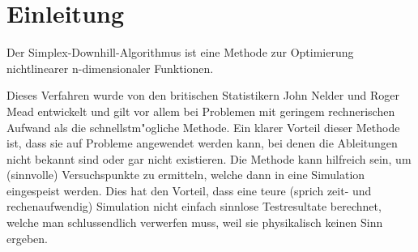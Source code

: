 \section{Einleitung}
Der Simplex-Downhill-Algorithmus ist eine Methode zur Optimierung nichtlinearer n-dimensionaler Funktionen.

Dieses Verfahren wurde von den britischen Statistikern John Nelder und Roger Mead entwickelt und gilt vor allem bei Problemen mit geringem rechnerischen Aufwand als die schnellstm"ogliche Methode.
Ein  klarer Vorteil dieser Methode ist, dass sie auf Probleme angewendet werden kann, bei denen  die Ableitungen nicht bekannt sind oder gar nicht existieren.
Die Methode kann hilfreich sein, um (sinnvolle) Versuchspunkte zu ermitteln, welche dann in eine Simulation eingespeist werden.
Dies hat den Vorteil, dass eine teure (sprich zeit- und rechenaufwendig) Simulation nicht einfach sinnlose Testresultate berechnet, welche man schlussendlich verwerfen muss, weil sie physikalisch keinen Sinn ergeben.

